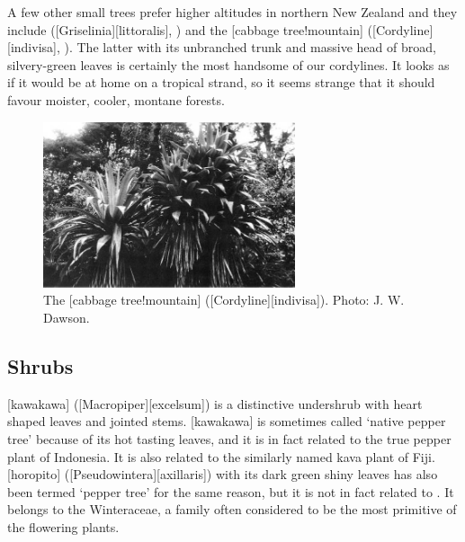 A few other small trees prefer higher altitudes in northern New Zealand and they include  ([Griselinia][littoralis], ) and the [cabbage tree!mountain] ([Cordyline][indivisa], ).
The latter with its unbranched trunk and massive head of broad, silvery-green leaves is certainly the most handsome of our cordylines.
It looks as if it would be at home on a tropical strand, so it seems strange that it should favour moister, cooler, montane forests.

\begin{figure}
	\includegraphics[width=0.66\textwidth]{graphics/figure61cabbagetree.jpg}
	\centering
	\caption[The mountain cabbage tree]{The [cabbage tree!mountain] ([Cordyline][indivisa]).
	Photo: J. W. Dawson.}%
	\label{fig:61cabbagetree}
\end{figure}

\subsection{Shrubs}

[kawakawa] ([Macropiper][excelsum]) is a distinctive undershrub with heart shaped leaves and jointed stems.
[kawakawa] is sometimes called `native pepper tree' because of its hot tasting leaves, and it is in fact related to the true pepper plant of Indonesia.
It is also related to the similarly named kava plant of Fiji.
[horopito] ([Pseudowintera][axillaris]) with its dark green shiny leaves has also been termed `pepper tree' for the same reason, but it is not in fact related to .
It belongs to the Winteraceae, a family often considered to be the most primitive of the flowering plants.

